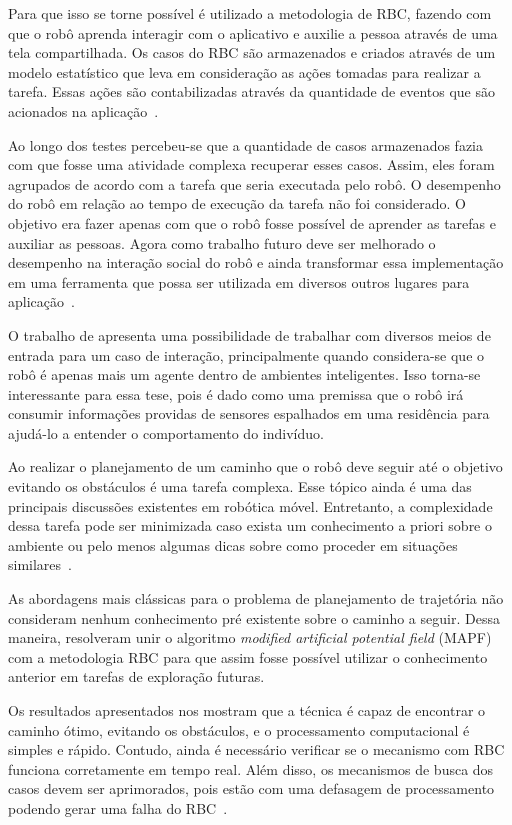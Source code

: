 Para que isso se torne possível é utilizado a metodologia de RBC, fazendo com que o robô aprenda interagir com o aplicativo e auxilie a pessoa através de uma tela compartilhada. Os casos do RBC são armazenados e criados através de um modelo estatístico que leva em consideração as ações tomadas para realizar a tarefa. Essas ações são contabilizadas através da quantidade de eventos que são acionados na aplicação~\cite{Park:2013}.

Ao longo dos testes percebeu-se que a quantidade de casos armazenados fazia com que fosse uma atividade complexa recuperar esses casos. Assim, eles foram agrupados de acordo com a tarefa que seria executada pelo robô. O desempenho do robô em relação ao tempo de execução da tarefa não foi considerado. O objetivo era fazer apenas com que o robô fosse possível de aprender as tarefas e auxiliar as pessoas. Agora como trabalho futuro deve ser melhorado o desempenho na interação social do robô e ainda transformar essa implementação em uma ferramenta que possa ser utilizada em diversos outros lugares para aplicação~\cite{Park:2013}.

O trabalho de  apresenta uma possibilidade de trabalhar com diversos meios de entrada para um caso de interação, principalmente quando considera-se que o robô é apenas mais um agente dentro de ambientes inteligentes. Isso torna-se interessante para essa tese, pois é dado como uma premissa que o robô irá consumir informações providas de sensores espalhados em uma residência para ajudá-lo a entender o comportamento do indivíduo.

Ao realizar o planejamento de um caminho que o robô deve seguir até o objetivo evitando os obstáculos é uma tarefa complexa. Esse tópico ainda é uma das principais discussões existentes em robótica móvel. Entretanto, a complexidade dessa tarefa pode ser minimizada caso exista um conhecimento a priori sobre o ambiente ou pelo menos algumas dicas sobre como proceder em situações similares~\cite{Wang:2013}.

As abordagens mais clássicas para o problema de planejamento de trajetória não consideram nenhum conhecimento pré existente sobre o caminho a seguir. Dessa maneira,  resolveram unir o algoritmo \emph{modified artificial potential field} (MAPF) com a metodologia RBC para que assim fosse possível utilizar o conhecimento anterior em tarefas de exploração futuras.

Os resultados apresentados nos mostram que a técnica é capaz de encontrar o caminho ótimo, evitando os obstáculos, e o processamento computacional é simples e rápido. Contudo, ainda é necessário verificar se o mecanismo com RBC funciona corretamente em tempo real. Além disso, os mecanismos de busca dos casos devem ser aprimorados, pois estão com uma defasagem de processamento podendo gerar uma falha do RBC~\cite{Wang:2013}.

